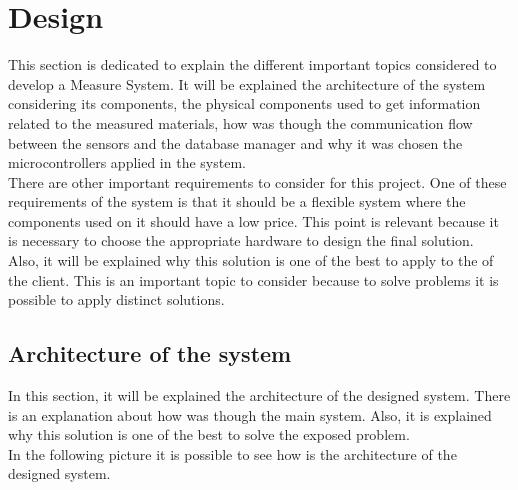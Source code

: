 
\chapter{Design}
\newpage

This section is dedicated to explain the different important topics considered to develop a Measure System. It will be explained the architecture of the system considering its components, the physical components used to get information related to the measured materials, how was though the communication flow between the sensors and the database manager and why it was chosen the microcontrollers applied in the system.\\

There are other important requirements to consider for this project. One of these requirements of the system is that it should be a flexible system where the components used on it should have a low price. This point is relevant because it is necessary to choose the appropriate hardware to design the final solution.\\

Also, it will be explained why this solution is one of the best to apply to the of the client. This is an important topic to consider because to solve problems it is possible to apply distinct solutions.

\section{Architecture of the system}

In this section, it will be explained the architecture of the designed system. There is an explanation about how was though the main system. Also, it is explained why this solution is one of the best to solve the exposed problem.\\

In the following picture it is possible to see how is the architecture of the designed system.\\

